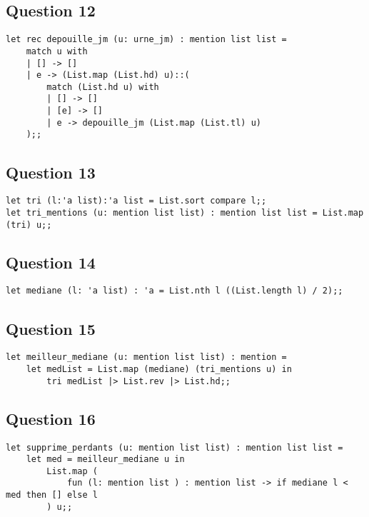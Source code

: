 \documentclass[french, 10pt, a4paper]{article}
\begin{document}
\subsection{Question 12}

\begin{verbatim}
let rec depouille_jm (u: urne_jm) : mention list list =
	match u with
	| [] -> []
	| e -> (List.map (List.hd) u)::(
		match (List.hd u) with
		| [] -> []
		| [e] -> []
		| e -> depouille_jm (List.map (List.tl) u)
	);;
\end{verbatim}



\subsection{Question 13}

\begin{verbatim}
let tri (l:'a list):'a list = List.sort compare l;;
let tri_mentions (u: mention list list) : mention list list = List.map (tri) u;;
\end{verbatim}



\subsection{Question 14}

\begin{verbatim}
let mediane (l: 'a list) : 'a = List.nth l ((List.length l) / 2);;
\end{verbatim}



\subsection{Question 15}

\begin{verbatim}
let meilleur_mediane (u: mention list list) : mention =
	let medList = List.map (mediane) (tri_mentions u) in
		tri medList |> List.rev |> List.hd;;
\end{verbatim}



\subsection{Question 16}

\begin{verbatim}
let supprime_perdants (u: mention list list) : mention list list =
	let med = meilleur_mediane u in
		List.map (
			fun (l: mention list ) : mention list -> if mediane l < med then [] else l
		) u;;
\end{verbatim}
\end{document}
